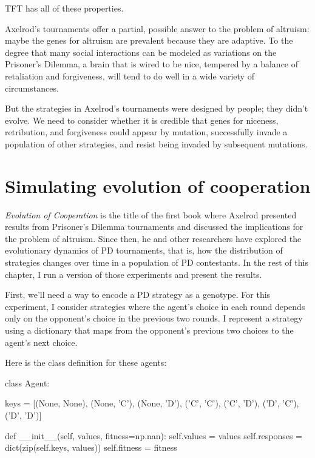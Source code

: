 \documentclass[12pt]{book}
\theoremstyle{exercise}
\begin{document}
TFT has all of these properties.

Axelrod's tournaments offer a partial, possible answer to the problem of altruism: maybe the genes for altruism are prevalent because they are adaptive.  To the degree that many social interactions can be modeled as variations on the Prisoner's Dilemma, a brain that is wired to be nice, tempered by a balance of retaliation and forgiveness, will tend to do well in a wide variety of circumstances.

But the strategies in Axelrod's tournaments were designed by people; they didn't evolve.  We need to consider whether it is credible that genes for niceness, retribution, and forgiveness could appear by mutation, successfully invade a population of other strategies, and resist being invaded by subsequent mutations.


\section{Simulating evolution of cooperation}

{\em Evolution of Cooperation} is the title of the first book where Axelrod presented results from Prisoner's Dilemma tournaments and discussed the implications for the problem of altruism.  Since then, he and other researchers have explored the evolutionary dynamics of PD tournaments, that is, how the distribution of strategies changes over time in a population of PD contestants.    In the rest of this chapter, I run a version of those experiments and present the results.

First, we'll need a way to encode a PD strategy as a genotype.  For this experiment, I consider strategies where the agent's choice in each round depends only on the opponent's choice in the previous two rounds.  I represent a strategy using a dictionary that maps from the opponent's previous two choices to the agent's next choice.

Here is the class definition for these agents:

\begin{code}
class Agent:
    
    keys = [(None, None),
            (None, 'C'),
            (None, 'D'),
            ('C', 'C'),
            ('C', 'D'),
            ('D', 'C'),
            ('D', 'D')]
    
    def __init__(self, values, fitness=np.nan):
        self.values = values
        self.responses = dict(zip(self.keys, values))
        self.fitness = fitness
\end{code}
\end{document}
